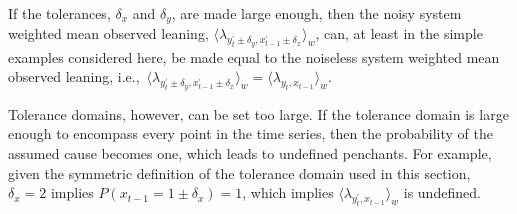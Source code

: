 \documentclass[twocolumn,aps,pre,groupedaddress]{revtex4-1}
\begin{document}


If the tolerances, $\delta_x$ and $\delta_y$, are made large enough, then the noisy system weighted mean observed leaning, $\langle \lambda_{y_t^\prime\pm\delta_y,x_{t-1}^\prime\pm\delta_x} \rangle_w$, can, at least in the simple examples considered here, be made equal to the noiseless system weighted mean observed leaning, i.e.,\ $\langle \lambda_{y_t^\prime\pm\delta_y,x_{t-1}^\prime\pm\delta_x} \rangle_w = \langle \lambda_{y_t,x_{t-1}} \rangle_w$.

Tolerance domains, however, can be set too large.  If the tolerance domain is large enough to encompass every point in the time series, then the probability of the assumed cause becomes one, which leads to undefined penchants.  For example, given the symmetric definition of the tolerance domain used in this section, $\delta_x = 2$ implies $P(x_{t-1} = 1\pm\delta_x) = 1$, which implies $\langle \lambda_{y_t^\prime,x_{t-1}} \rangle_w$ is undefined.
\end{document}
